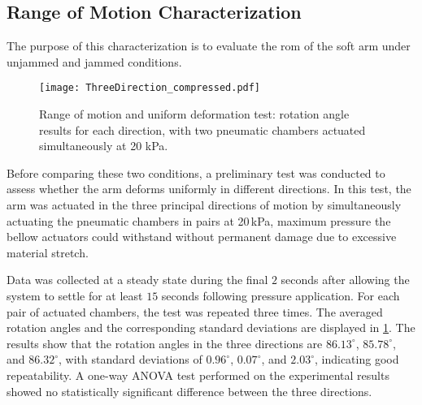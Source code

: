 \subsection{Range of Motion Characterization}
\label{sec:charact}

The purpose of this characterization is to evaluate the \gls{rom} of the soft arm under unjammed and jammed conditions.
\begin{figure}[]
    \centering
    \texttt{[image: ThreeDirection\_compressed.pdf]}
    \caption{Range of motion and uniform deformation test: rotation angle results for each direction, with two pneumatic chambers actuated simultaneously at 20 kPa.}
    \label{fig:threedir}
    \vspace{-2em}
\end{figure}

Before comparing these two conditions, a preliminary test was conducted to assess whether the arm deforms uniformly in different directions. In this test, the arm was actuated in the three principal directions of motion by simultaneously actuating the pneumatic chambers in pairs at 20\,kPa, maximum pressure the bellow actuators could withstand without permanent damage due to excessive material stretch. 

Data was collected at a steady state during the final $2$ seconds after allowing the system to settle for at least $15$ seconds following pressure application. For each pair of actuated chambers, the test was repeated three times. The averaged rotation angles and the corresponding standard deviations are displayed in \cref{fig:threedir}. The results show that the rotation angles in the three directions are $86.13^{\circ}$, $85.78^{\circ}$, and $86.32^{\circ}$, with standard deviations of $0.96^{\circ}$, $0.07^{\circ}$, and $2.03^{\circ}$, indicating good repeatability. A one-way ANOVA test performed on the experimental results showed no statistically significant difference between the three directions.

